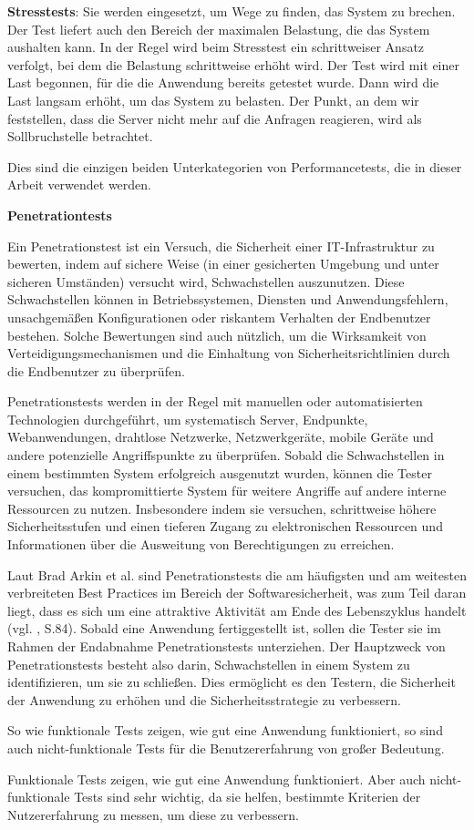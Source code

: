 \textbf{Stresstests}: Sie werden eingesetzt, um Wege zu finden, das System zu
brechen. Der Test liefert auch den Bereich der maximalen Belastung,
die das System aushalten kann. In der Regel wird beim Stresstest ein
schrittweiser Ansatz verfolgt, bei dem die Belastung schrittweise
erhöht wird. Der Test wird mit einer Last begonnen, für die die Anwendung
bereits getestet wurde. Dann wird die Last langsam erhöht, um das System
zu belasten. Der Punkt, an dem wir feststellen, dass die Server nicht mehr
auf die Anfragen reagieren, wird als Sollbruchstelle betrachtet.


Dies sind die einzigen beiden Unterkategorien von Performancetests,
die in dieser Arbeit verwendet werden.



\textbf{Penetrationtests}

Ein Penetrationstest ist ein Versuch, die Sicherheit einer IT-Infrastruktur
zu bewerten, indem auf sichere Weise (in einer gesicherten Umgebung und unter sicheren Umständen)
versucht wird, Schwachstellen auszunutzen. Diese Schwachstellen können in Betriebssystemen, Diensten
und Anwendungsfehlern, unsachgemäßen Konfigurationen oder riskantem
Verhalten der Endbenutzer bestehen. Solche Bewertungen sind auch nützlich,
um die Wirksamkeit von Verteidigungsmechanismen und die Einhaltung von
Sicherheitsrichtlinien durch die Endbenutzer zu überprüfen.


Penetrationstests werden in der Regel mit manuellen oder automatisierten
Technologien durchgeführt, um systematisch Server, Endpunkte, Webanwendungen,
drahtlose Netzwerke, Netzwerkgeräte, mobile Geräte und andere potenzielle
Angriffspunkte zu \"uberpr\"ufen. Sobald die Schwachstellen in einem
bestimmten System erfolgreich ausgenutzt wurden, können die Tester versuchen,
das kompromittierte System für weitere Angriffe auf andere interne Ressourcen
zu nutzen. Insbesondere indem sie versuchen, schrittweise höhere
Sicherheitsstufen und einen tieferen Zugang zu elektronischen Ressourcen
und Informationen über die Ausweitung von Berechtigungen zu erreichen.


Laut Brad Arkin et al. sind Penetrationstests die am häufigsten und am
weitesten verbreiteten Best Practices im Bereich der Softwaresicherheit,
was zum Teil daran liegt, dass es sich um eine attraktive Aktivität am
Ende des Lebenszyklus handelt (vgl. \cite{1392709}, S.84).  Sobald eine
Anwendung fertiggestellt ist, sollen die Tester sie im Rahmen der Endabnahme
Penetrationstests unterziehen. Der Hauptzweck von Penetrationstests besteht
also darin, Schwachstellen in einem System zu identifizieren, um sie zu
schließen. Dies ermöglicht es den Testern, die Sicherheit der Anwendung
zu erhöhen und die Sicherheitsstrategie zu verbessern.


So wie funktionale Tests zeigen, wie gut eine Anwendung funktioniert,
so sind auch nicht-funktionale Tests für die Benutzererfahrung von
großer Bedeutung.

Funktionale Tests zeigen, wie gut eine Anwendung funktioniert.
Aber auch nicht-funktionale Tests sind sehr wichtig, da sie helfen,
bestimmte Kriterien der Nutzererfahrung zu messen, um diese zu verbessern.

